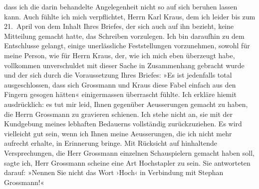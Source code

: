 \begin{ledgroupsized}[t]{13cm}
               dass ich die darin behandelte Angelegenheit nicht so auf sich beruhen lassen kann.
               Auch fühlte ich mich verpflichtet, Herrn Karl
                  Kraus, dem ich leider bis zum 21. April von dem Inhalt Ihres
               Briefes, der sich auch auf ihn bezieht, keine Mitteilung gemacht hatte, das Schreiben
               vorzulegen. Ich bin daraufhin zu dem Entschlusse gelangt, einige unerlässliche
               Feststellungen vorzunehmen, sowohl für meine Person, wie für Herrn Kraus, der, wie ich mich eben überzeugt habe,
               vollkommen unverschuldet mit dieser Sache in Zusammenhang gebracht wurde und der sich
               durch die Voraussetzung Ihres Briefes: »Es ist jedenfalls total ausgeschlossen, dass
               sich Grossmann und Kraus diese Fabel einfach aus den Fingern gesogen hätten«
               einigermassen überrascht fühlte.\pend
           \pstart
           Ich erkläre hiemit ausdrücklich: es tut mir leid, Ihnen gegenüber Aeusserungen
               gemacht zu haben, die Herrn Grossmann zu
               gravieren schienen. Ich stehe nicht an, sie mit der Kundgebung meines lebhaften
               Bedauerns vollständig zurückzuziehen. Es wird vielleicht gut sein, wenn ich Ihnen
               meine Aeusserungen, die ich nicht mehr aufrecht erhalte, in Erinnerung bringe. Mit
               Rücksicht auf hinhaltende Versprechungen, die Herr Grossmann einzelnen {\pb}Schauspielern gemacht
               haben soll, sagte ich, Herr Grossmann scheine
               eine Art Hochstapler zu sein. Sie antworteten darauf: »Nennen Sie nicht das Wort
               ›Hoch‹ in Verbindung mit Stephan Grossmann!«

\end{ledgroupsized}
